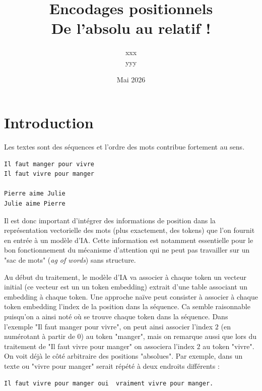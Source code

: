 \documentclass{article}
\title{Encodages positionnels \\
{\small De l'absolu au relatif !}}
\date{Mai 2026}
\author{xxx\\ {\small yyy}}
\begin{document}
\maketitle

\section{Introduction}

Les textes sont des séquences et l'ordre des mots contribue fortement au sens. 

\begin{tcolorbox}[examplebox]
\begin{verbatim}
Il faut manger pour vivre
Il faut vivre pour manger

Pierre aime Julie
Julie aime Pierre
\end{verbatim}
\end{tcolorbox}


Il est donc important d'intégrer  des informations de position dans la représentation vectorielle  des mots (plus exactement, des tokens) que l'on fournit en entrée à un modèle d'IA. Cette information est notamment essentielle pour le bon fonctionnement du mécanisme d'attention qui ne peut pas travailler sur un "sac de mots" (\textit{ag of words}) sans structure.

Au début du traitement, le modèle d'IA va associer à chaque token un vecteur initial (ce vecteur est un un token embedding) extrait d'une table associant un embedding à chaque token. Une approche naïve peut consister à associer à chaque token embedding l'index de la position dans la séquence. Ca semble raisonnable puisqu'on a ainsi noté où se trouve chaque token dans la séquence. Dans l'exemple "Il faut manger pour vivre", on peut ainsi associer l'index $2$ (en numérotant à partir de $0$) au token "manger", mais on remarque aussi que lors du traitement de "Il faut vivre pour manger" on associera l'index $2$ au token "vivre". On voit déjà le côté arbitraire des positions "absolues". Par exemple, dans un texte ou "vivre pour manger" serait répété à deux endroits différents  :

\begin{tcolorbox}[examplebox]
\begin{verbatim}
Il faut vivre pour manger oui  vraiment vivre pour manger.
\end{verbatim}
\end{tcolorbox}
\end{document}
